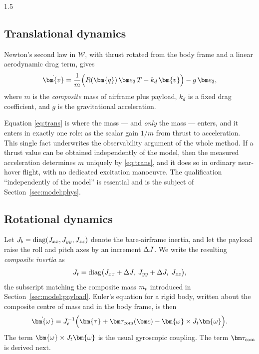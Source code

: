 \begin{spacing}{1.5}
\subsection{Translational dynamics}\label{sec:model:trans}

Newton's second law in $\mathcal{W}$, with thrust rotated from the body
frame and a linear aerodynamic drag term, gives
\begin{equation}
\dot{\bm{v}} = \frac{1}{m}\Bigl( R(\bm{q})\, \ev\, T - k_d\, \bm{v} \Bigr) - g\, \ev,
\label{eq:trans}
\end{equation}
where $m$ is the \emph{composite} mass of airframe plus payload, $k_d$ is
a fixed drag coefficient, and $g$ is the gravitational acceleration.

Equation \eqref{eq:trans} is where the mass --- and \emph{only} the mass
--- enters, and it enters in exactly one role: as the scalar gain $1/m$
from thrust to acceleration. This single fact underwrites the
observability argument of the whole method. If a thrust value can be
obtained independently of the model, then the measured acceleration
determines $m$ uniquely by \eqref{eq:trans}, and it does so in ordinary
near-hover flight, with no dedicated excitation manoeuvre. The
qualification ``independently of the model'' is essential and is the
subject of Section~\ref{sec:model:phys}.

\subsection{Rotational dynamics}\label{sec:model:rot}

Let $J_b = \mathrm{diag}(J_{xx}, J_{yy}, J_{zz})$ denote the
bare-airframe inertia, and let the payload raise the roll and pitch axes
by an increment $\Delta J$. We write the resulting \emph{composite inertia} as
\begin{equation}
J_t = \mathrm{diag}\bigl(J_{xx} + \Delta J,\; J_{yy} + \Delta J,\; J_{zz}\bigr),
\label{eq:Jt}
\end{equation}
the subscript matching the composite mass $m_t$ introduced in
Section~\ref{sec:model:payload}. Euler's equation for a rigid body,
written about the composite centre of mass and in the body frame, is then
\begin{equation}
\dot{\bm{\omega}} = \Jt^{-1}\Bigl( \bm{\tau} + \tcom(\cvec) - \bm{\omega} \times \Jt \bm{\omega} \Bigr).
\label{eq:rot}
\end{equation}
The term $\bm{\omega} \times \Jt \bm{\omega}$ is the usual gyroscopic
coupling. The term $\tcom$ is derived next.


\end{spacing}
